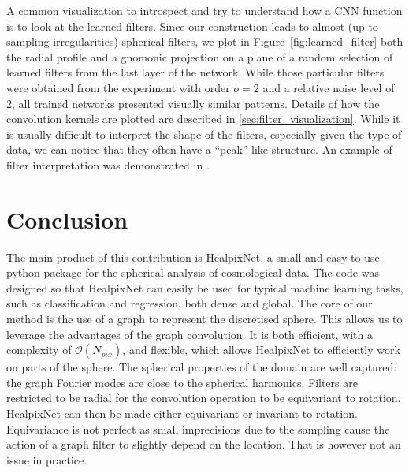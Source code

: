 \documentclass[final,twocolumn,3p,times,sort&compress]{elsarticle}
\newcommand{\TK}[1]{{\color{red}{TK:#1}}}
\newcommand{\figref}[1]{Figure~\ref{fig:#1}}
\newcommand{\1}{\b{1}}              %
\newcommand{\0}{\b{0}}              %
\newcommand{\bO}{\mathcal{O}}
\begin{document}
A common visualization to introspect and try to understand how a CNN function is to look at the learned filters.
Since our construction leads to almost (up to sampling irregularities) spherical filters, we plot in \figref{learned_filter} both the radial profile and a gnomonic projection on a plane of a random selection of learned filters from the last layer of the network.
While those particular filters were obtained from the experiment with order $o=2$ and a relative noise level of $2$, all trained networks presented visually similar patterns.
Details of how the convolution kernels are plotted are described in \ref{sec:filter_visualization}.
While it is usually difficult to interpret the shape of the filters, especially given the type of data, we can notice that they often have a ``peak'' like structure.
An example of filter interpretation was demonstrated in \citep{Ribli2018learningfrom}.

\section{Conclusion}
\label{sec:conclusion}

The main product of this contribution is HealpixNet, a small and easy-to-use python package for the spherical analysis of cosmological data.
The code was designed so that HealpixNet can easily be used for typical machine learning tasks, such as classification and regression, both dense and global.
The core of our method is the use of a graph to represent the discretised sphere.
This allows us to leverage the advantages of the graph convolution.
It is both efficient, with a complexity of $\bO(N_{pix})$, and flexible, which allows HealpixNet to efficiently work on parts of the sphere.
The spherical properties of the domain are well captured: the graph Fourier modes are close to the spherical harmonics.
Filters are restricted to be radial for the convolution operation to be equivariant to rotation.
HealpixNet can then be made either equivariant or invariant to rotation.
Equivariance is not perfect as small imprecisions due to the sampling cause the action of a graph filter to slightly depend on the location.
That is however not an issue in practice.
\end{document}
